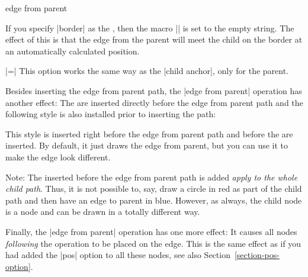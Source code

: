 \begin{pathoperation}{edge from parent}{}
\begin{itemize}
\begin{itemize}
      If you specify |border| as the , then the macro
      |\tikzchildanchor| is set to the empty string. The effect of
      this is that the edge from the parent will meet the child on the
      border at an automatically calculated position.
\begin{codeexample}[]
\end{codeexample}
      |=|
      This option works the same way as the |child anchor|, only for
      the parent.
    \end{itemize}
  \end{itemize}

  Besides inserting the edge from parent path, the |edge from parent|
  operation has another effect: The  are inserted
  directly before the edge from parent path and the following style is
  also installed prior to inserting the path:
  \begin{itemize}
    This style is inserted right before the edge from parent path and
    before the  are inserted. By default, it just draws
    the edge from parent, but you can use it to make the edge look
    different. 
\begin{codeexample}[]
\end{codeexample}
  \end{itemize}

  Note: The  inserted before the edge from parent path
  is added \emph{apply to the whole child path}. Thus, it is not
  possible to, say, draw a circle in red as part of the child path and
  then have an edge to parent in blue. However, as always, the child
  node is a node and can be drawn in a totally different way.

  Finally, the |edge from parent| operation has one more effect: It
  causes all nodes \emph{following} the operation to be placed on the
  edge. This is the same effect as if you had added the |pos| option
  to all these nodes, see also Section~\ref{section-pos-option}.


\end{pathoperation}
